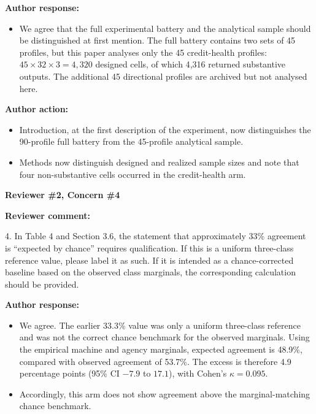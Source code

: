 \documentclass[11pt]{article}
\newcommand{\rvcomment}[1]{{\color{ReviewerGreen}#1}}
\newcommand{\concern}[1]{\textbf{\color{ReviewerGreen}#1}}
\begin{document}
\textbf{Author response:}

\begin{itemize}
\item We agree that the full experimental battery and the analytical sample should be distinguished at
first mention. The full battery contains two sets of 45 profiles, but this paper analyses only the
45 credit-health profiles: $45 \times 32 \times 3 = 4{,}320$ designed cells, of which 4{,}316
returned substantive outputs. The additional 45 directional profiles are archived but not analysed
here.
\end{itemize}

\textbf{Author action:}

\begin{itemize}
\item Introduction, at the first description of the experiment, now distinguishes the
90-profile full battery from the 45-profile analytical sample.
\item Methods now distinguish designed and realized sample sizes and note that four
non-substantive cells occurred in the credit-health arm.
\end{itemize}

\vspace{4pt}

\concern{Reviewer \#2, Concern \#4}

\concern{Reviewer comment:}

\rvcomment{4. In Table 4 and Section 3.6, the statement that approximately 33\% agreement is
``expected by chance'' requires qualification. If this is a uniform three-class reference value,
please label it as such. If it is intended as a chance-corrected baseline based on the observed
class marginals, the corresponding calculation should be provided.}

\textbf{Author response:}

\begin{itemize}
\item We agree. The earlier 33.3\% value was only a uniform three-class reference and was not the
correct chance benchmark for the observed marginals. Using the empirical machine and agency
marginals, expected agreement is 48.9\%, compared with observed agreement of 53.7\%. The excess is
therefore 4.9 percentage points (95\% CI $-7.9$ to $17.1$), with Cohen's $\kappa=0.095$.
\item Accordingly, this arm does not show agreement above the marginal-matching chance benchmark.
\end{itemize}
\end{document}
